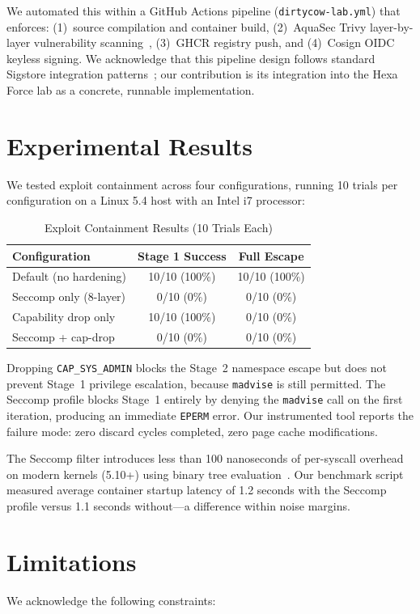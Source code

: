 \documentclass[conference]{IEEEtran}
\begin{document}
We automated this within a GitHub Actions pipeline (\texttt{dirtycow-lab.yml}) that enforces: (1)~source compilation and container build, (2)~AquaSec Trivy layer-by-layer vulnerability scanning~\cite{b4}, (3)~GHCR registry push, and (4)~Cosign OIDC keyless signing. We acknowledge that this pipeline design follows standard Sigstore integration patterns~\cite{b2}; our contribution is its integration into the Hexa Force lab as a concrete, runnable implementation.

\section{Experimental Results}
We tested exploit containment across four configurations, running 10 trials per configuration on a Linux 5.4 host with an Intel i7 processor:

\begin{table}[h]
\centering
\caption{Exploit Containment Results (10 Trials Each)}
\label{tab:results}
\begin{tabular}{@{}lcc@{}}
\toprule
\textbf{Configuration} & \textbf{Stage 1 Success} & \textbf{Full Escape} \\
\midrule
Default (no hardening) & 10/10 (100\%) & 10/10 (100\%) \\
Seccomp only (8-layer) & 0/10 (0\%) & 0/10 (0\%) \\
Capability drop only & 10/10 (100\%) & 0/10 (0\%) \\
Seccomp + cap-drop & 0/10 (0\%) & 0/10 (0\%) \\
\bottomrule
\end{tabular}
\end{table}

Dropping \texttt{CAP\_SYS\_ADMIN} blocks the Stage~2 namespace escape but does not prevent Stage~1 privilege escalation, because \texttt{madvise} is still permitted. The Seccomp profile blocks Stage~1 entirely by denying the \texttt{madvise} call on the first iteration, producing an immediate \texttt{EPERM} error. Our instrumented tool reports the failure mode: zero discard cycles completed, zero page cache modifications.

The Seccomp filter introduces less than 100 nanoseconds of per-syscall overhead on modern kernels (5.10+) using binary tree evaluation~\cite{b13}. Our benchmark script measured average container startup latency of 1.2 seconds with the Seccomp profile versus 1.1 seconds without---a difference within noise margins.

\section{Limitations}
We acknowledge the following constraints:
\end{document}
